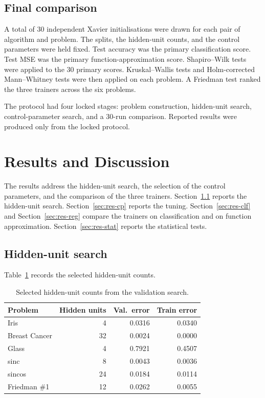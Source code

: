 \documentclass[conference,10pt]{IEEEtran}
\begin{document}
\subsection{Final comparison}
\label{sec:final}
A total of 30 independent Xavier initialisations were drawn for each pair of algorithm and problem.
The splits, the hidden-unit counts, and the control parameters were held fixed.
Test accuracy was the primary classification score.
Test MSE was the primary function-approximation score.
Shapiro--Wilk tests were applied to the 30 primary scores.
Kruskal--Wallis tests and Holm-corrected Mann--Whitney tests were then applied on each problem.
A Friedman test ranked the three trainers across the six problems.

The protocol had four locked stages: problem construction, hidden-unit search, control-parameter search, and a 30-run comparison.
Reported results were produced only from the locked protocol.

\section{Results and Discussion}
\label{sec:results}
The results address the hidden-unit search, the selection of the control parameters, and the comparison of the three trainers.
Section~\ref{sec:res-hu} reports the hidden-unit search.
Section~\ref{sec:res-cp} reports the tuning.
Section~\ref{sec:res-clf} and Section~\ref{sec:res-reg} compare the trainers on classification and on function approximation.
Section~\ref{sec:res-stat} reports the statistical tests.

\subsection{Hidden-unit search}
\label{sec:res-hu}
Table~\ref{tab:hidden} records the selected hidden-unit counts.

\begin{table}[H]
\caption{Selected hidden-unit counts from the validation search.}
\label{tab:hidden}
\begin{center}
\begin{tabular}{lrrr}
\toprule
Problem & Hidden units & Val.\ error & Train error \\
\midrule
Iris & 4 & 0.0316 & 0.0340 \\
Breast Cancer & 32 & 0.0024 & 0.0000 \\
Glass & 4 & 0.7921 & 0.4507 \\
sinc & 8 & 0.0043 & 0.0036 \\
sincos & 24 & 0.0184 & 0.0114 \\
Friedman \#1 & 12 & 0.0262 & 0.0055 \\
\bottomrule
\end{tabular}
\end{center}
\end{table}
\end{document}
